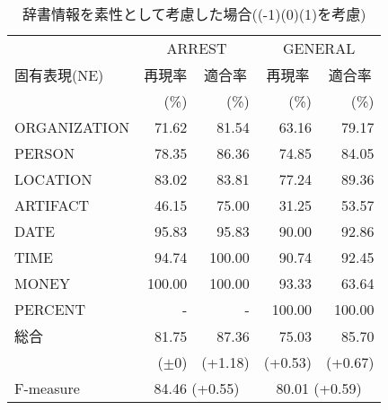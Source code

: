{\begin{table*}[htbp]
  \begin{center}
    \caption{辞書情報を素性として考慮した場合\mbox{((-1)(0)(1)を考慮)}}
    \label{Comparison6} 
    \begin{tabular}{|l|r@{ }r|r@{ }r|}
      \hline
      & \multicolumn{2}{c|}{ARREST} 
      & \multicolumn{2}{c|}{GENERAL}\\
      \cline{2-5}
      固有表現(NE) & \multicolumn{1}{c}{再現率} 
      & \multicolumn{1}{c|}{適合率} & \multicolumn{1}{c}{再現率} 
      & \multicolumn{1}{c|}{適合率} \\
      & (\%) & (\%) & (\%) & (\%) \\
      \hline      
      ORGANIZATION &  71.62 &  81.54 &  63.16 &  79.17 \\
      PERSON       &  78.35 &  86.36 &  74.85 &  84.05 \\
      LOCATION     &  83.02 &  83.81 &  77.24 &  89.36 \\
      ARTIFACT     &  46.15 &  75.00 &  31.25 &  53.57 \\
      DATE         &  95.83 &  95.83 &  90.00 &  92.86 \\
      TIME         &  94.74 & 100.00 &  90.74 &  92.45 \\
      MONEY        & 100.00 & 100.00 &  93.33 &  63.64 \\
      PERCENT      &      - &      - & 100.00 & 100.00 \\
      \hline
      総合 & 81.75 & 87.36 & 75.03 & 85.70\\
      & ($\pm$0) & (+1.18) & (+0.53) & (+0.67) \\
      \hline
      \hline
      F-measure & \multicolumn{2}{c|}{84.46 (+0.55)} 
      & \multicolumn{2}{c|}{80.01 (+0.59)} \\
      \hline
    \end{tabular}
  \end{center}


\end{table*}}
